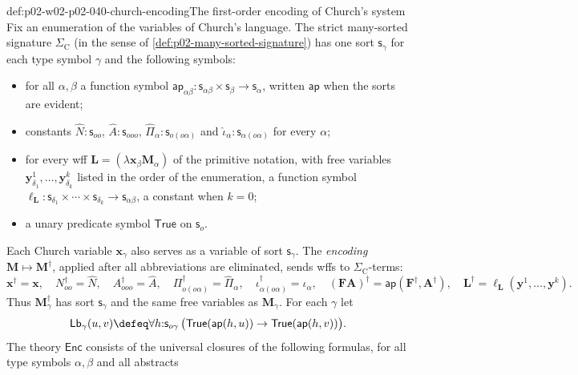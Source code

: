 \begin{hbdefinition}{def:p02-w02-p02-040-church-encoding}{The first-order encoding of Church's system}
Fix an enumeration of the variables of Church's language.  The strict
many-sorted signature \(\Sigma_{\mathrm C}\) (in the sense of
\cref{def:p02-many-sorted-signature}) has one sort \(\mathsf s_\gamma\) for each type
symbol \(\gamma\) and the following symbols:
\begin{itemize}
 \item for all \(\alpha,\beta\) a function symbol
   \(\mathsf{ap}_{\alpha\beta}:\mathsf s_{\alpha\beta}\times\mathsf s_\beta\to\mathsf s_\alpha\),
   written \(\mathsf{ap}\) when the sorts are evident;
 \item constants \(\widehat N:\mathsf s_{oo}\), \(\widehat A:\mathsf s_{ooo}\),
   \(\widehat\Pi_\alpha:\mathsf s_{o(o\alpha)}\) and
   \(\widehat\iota_\alpha:\mathsf s_{\alpha(o\alpha)}\) for every \(\alpha\);
 \item for every wff \(\mathbf L=(\lambda\mathbf x_\beta\mathbf M_\alpha)\) of the
   primitive notation, with free variables
   \(\mathbf y^1_{\delta_1},\ldots,\mathbf y^k_{\delta_k}\) listed in the order of
   the enumeration, a function symbol
   \(\ell_{\mathbf L}:\mathsf s_{\delta_1}\times\cdots\times\mathsf s_{\delta_k}\to\mathsf s_{\alpha\beta}\),
   a constant when \(k=0\);
 \item a unary predicate symbol \(\mathsf{True}\) on \(\mathsf s_o\).
\end{itemize}
Each Church variable \(\mathbf x_\gamma\) also serves as a variable of sort
\(\mathsf s_\gamma\).  The \emph{encoding} \(\mathbf M\mapsto\mathbf M^\dagger\),
applied after all abbreviations are eliminated, sends wffs to
\(\Sigma_{\mathrm C}\)-terms:
\[
 \mathbf x^\dagger=\mathbf x,\quad
 N_{oo}^\dagger=\widehat N,\quad A_{ooo}^\dagger=\widehat A,\quad
 \Pi_{o(o\alpha)}^\dagger=\widehat\Pi_\alpha,\quad
 \iota_{\alpha(o\alpha)}^\dagger=\widehat\iota_\alpha,\quad
 (\mathbf F\mathbf A)^\dagger=\mathsf{ap}(\mathbf F^\dagger,\mathbf A^\dagger),\quad
 \mathbf L^\dagger=\ell_{\mathbf L}(\mathbf y^1,\ldots,\mathbf y^k).
\]
Thus \(\mathbf M_\gamma^\dagger\) has sort \(\mathsf s_\gamma\) and the same free
variables as \(\mathbf M_\gamma\).  For each \(\gamma\) let
\[
 \mathsf{Lb}_\gamma(u,v)\defeq\forall h{:}\mathsf s_{o\gamma}\,
 \bigl(\mathsf{True}(\mathsf{ap}(h,u))\to\mathsf{True}(\mathsf{ap}(h,v))\bigr).
\]
The theory \(\mathsf{Enc}\) consists of the universal closures of the
following formulas, for all type symbols \(\alpha,\beta\) and all abstracts

\end{hbdefinition}
